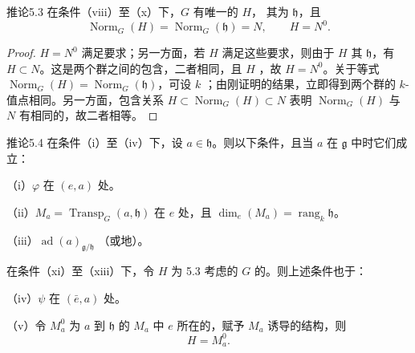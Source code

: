 \begin{SGAresult}{推论}{5.3}
在条件（viii）至（x）下，$G$ 有唯一的 $H$，
其为 $\mathfrak h$，且
\[\operatorname{Norm}_G(H)=\operatorname{Norm}_G(\mathfrak h)=N,\qquad H=N^0.\]
\end{SGAresult}
\begin{proof}
$H=N^0$ 满足要求；另一方面，若 $H$ 满足这些要求，则由于 $H$ 其 $\mathfrak h$，有 $H\subset N$。这是两个群之间的包含，二者相同，且 $H$ ，故 $H=N^0$。关于等式 $\operatorname{Norm}_G(H)=\operatorname{Norm}_G(\mathfrak h)$，可设 $k$ ；由刚证明的结果，立即得到两个群的 $k$-值点相同。另一方面，包含关系 $H\subset\operatorname{Norm}_G(H)\subset N$ 表明 $\operatorname{Norm}_G(H)$ 与 $N$ 有相同的，故二者相等。
\end{proof}
\begin{SGAresult}{推论}{5.4}
在条件（i）至（iv）下，设 $a\in\mathfrak h$。则以下条件，且当 $a$ 在 $\mathfrak g$ 中时它们成立：

（i）$\varphi$ 在 $(e,a)$ 处。

（ii）$M_a=\operatorname{Transp}_G(a,\mathfrak h)$ 在 $e$ 处，且 $\dim_e(M_a)=\operatorname{rang}_k\mathfrak h$。

（iii）$\operatorname{ad}(a)_{\mathfrak g/\mathfrak h}$ （或地）。

在条件（xi）至（xiii）下，令 $H$ 为 5.3 考虑的 $G$ 的。则上述条件也于：

（iv）$\psi$ 在 $(\bar e,a)$ 处。

（v）令 $M_a^0$ 为 $a$ 到 $\mathfrak h$ 的 $M_a$ 中 $e$ 所在的，赋予 $M_a$ 诱导的结构，则
\[H=M_a^0.\]
\end{SGAresult}

